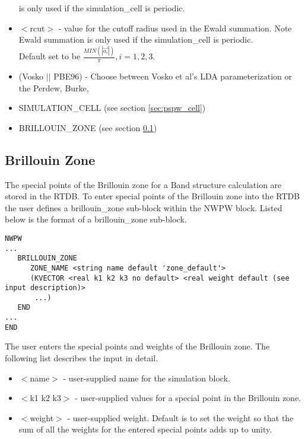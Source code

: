 \begin{itemize}
                          is only used if the simulation\_cell is periodic.
        \item $<$rcut$>$ - value for the cutoff radius used
                          in the Ewald summation. Note Ewald summation
                          is only used if the simulation\_cell is periodic. \\
                           Default set to be
                          $\frac{MIN(\left| \vec{a_i} \right|)}{\pi}, i=1,2,3$.
        \item (Vosko $||$ PBE96) - Choose between Vosko et al's LDA 
                               parameterization or the Perdew, Burke, 
        \item SIMULATION\_CELL (see section \ref{sec:pspw_cell})
        \item BRILLOUIN\_ZONE  (see section \ref{sec:band_brillouin_zone})
\end{itemize}


\subsection{Brillouin Zone}
\label{sec:band_brillouin_zone}
The special points of the Brillouin zone for a Band structure calculation are 
stored in the RTDB.  To enter special points of the Brillouin zone into the RTDB 
the user defines a brillouin\_zone sub-block within the NWPW 
block.  Listed below is the format of a brillouin\_zone sub-block.
\begin{verbatim}
NWPW
...
   BRILLOUIN_ZONE
      ZONE_NAME <string name default 'zone_default'>
      (KVECTOR <real k1 k2 k3 no default> <real weight default (see input description)>
       ...)
   END
...
END
\end{verbatim}
The user enters the special points and weights of the
Brillouin zone.  The following list describes the input in detail.
\begin{itemize}
        \item $<$name$>$ - user-supplied name for the simulation block. 
        \item $<$k1 k2 k3$>$ - user-supplied values for a special point in the
                               Brillouin zone.
        \item $<$weight$>$ - user-supplied weight.  Default is to set the weight
                         so that the sum of all the weights for the entered  
                         special points adds up to unity.
\end{itemize}


